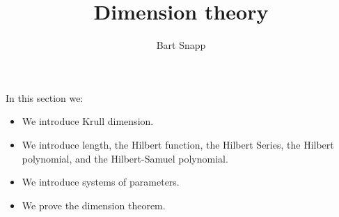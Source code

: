 \documentclass{ximera}
\author{Bart Snapp}
\title{Dimension theory}
\begin{document}
\begin{abstract}
\end{abstract}
\maketitle
In this section we:

\begin{itemize}
\item We introduce Krull dimension.
\item We introduce length, the Hilbert function, the Hilbert Series,
  the Hilbert polynomial, and the Hilbert-Samuel polynomial.
\item We introduce systems of parameters.
\item We prove the dimension theorem.
\end{itemize}
\end{document}
